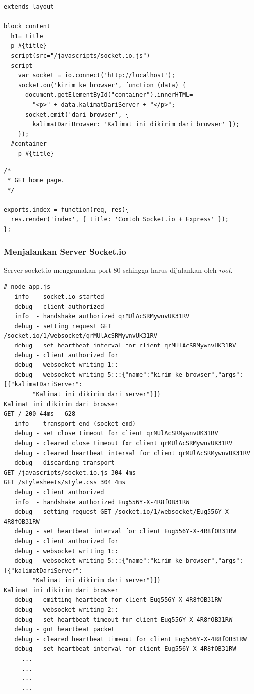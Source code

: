 \lstset{language=html,caption=views/index.jade}
\begin{lstlisting}
extends layout

block content
  h1= title
  p #{title}
  script(src="/javascripts/socket.io.js")
  script
    var socket = io.connect('http://localhost');
    socket.on('kirim ke browser', function (data) {
      document.getElementById("container").innerHTML=
        "<p>" + data.kalimatDariServer + "</p>";
      socket.emit('dari browser', { 
        kalimatDariBrowser: 'Kalimat ini dikirim dari browser' });
    });
  #container
    p #{title}
\end{lstlisting}

\lstset{language=html,caption=routes/index.js}
\begin{lstlisting}
/*
 * GET home page.
 */

exports.index = function(req, res){
  res.render('index', { title: 'Contoh Socket.io + Express' });
};
\end{lstlisting}

\subsubsection{Menjalankan Server Socket.io}

Server socket.io menggunakan port 80 sehingga harus dijalankan oleh \textit{root}. 

\lstset{language=Bash,caption=Menjalankan server Socket.io}
\begin{lstlisting}
# node app.js 
   info  - socket.io started
   debug - client authorized
   info  - handshake authorized qrMUlAcSRMywnvUK31RV
   debug - setting request GET /socket.io/1/websocket/qrMUlAcSRMywnvUK31RV
   debug - set heartbeat interval for client qrMUlAcSRMywnvUK31RV
   debug - client authorized for 
   debug - websocket writing 1::
   debug - websocket writing 5:::{"name":"kirim ke browser","args":[{"kalimatDariServer":
		"Kalimat ini dikirim dari server"}]}
Kalimat ini dikirim dari browser
GET / 200 44ms - 628
   info  - transport end (socket end)
   debug - set close timeout for client qrMUlAcSRMywnvUK31RV
   debug - cleared close timeout for client qrMUlAcSRMywnvUK31RV
   debug - cleared heartbeat interval for client qrMUlAcSRMywnvUK31RV
   debug - discarding transport
GET /javascripts/socket.io.js 304 4ms
GET /stylesheets/style.css 304 4ms
   debug - client authorized
   info  - handshake authorized Eug556Y-X-4R8fOB31RW
   debug - setting request GET /socket.io/1/websocket/Eug556Y-X-4R8fOB31RW
   debug - set heartbeat interval for client Eug556Y-X-4R8fOB31RW
   debug - client authorized for 
   debug - websocket writing 1::
   debug - websocket writing 5:::{"name":"kirim ke browser","args":[{"kalimatDariServer":
		"Kalimat ini dikirim dari server"}]}
Kalimat ini dikirim dari browser
   debug - emitting heartbeat for client Eug556Y-X-4R8fOB31RW
   debug - websocket writing 2::
   debug - set heartbeat timeout for client Eug556Y-X-4R8fOB31RW
   debug - got heartbeat packet
   debug - cleared heartbeat timeout for client Eug556Y-X-4R8fOB31RW
   debug - set heartbeat interval for client Eug556Y-X-4R8fOB31RW
	 ...
	 ...
	 ...
	 ...
\end{lstlisting}

